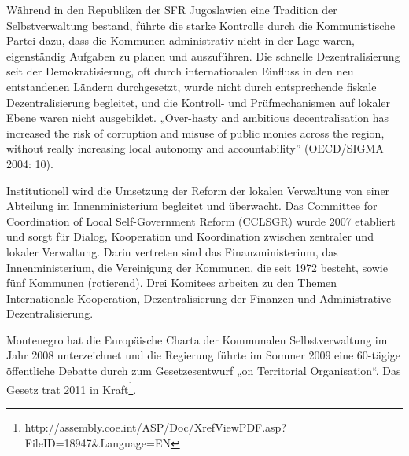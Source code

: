Während in den Republiken der SFR Jugoslawien eine Tradition der Selbstverwaltung bestand, führte die starke Kontrolle durch die Kommunistische Partei dazu, dass die Kommunen administrativ nicht in der Lage waren, eigenständig Aufgaben zu planen und auszuführen. Die schnelle Dezentralisierung seit der Demokratisierung, oft durch internationalen Einfluss in den neu entstandenen Ländern durchgesetzt, wurde nicht durch entsprechende fiskale Dezentralisierung begleitet, und die Kontroll- und Prüfmechanismen auf lokaler Ebene waren nicht ausgebildet. „Over-hasty and ambitious decentralisation has increased the risk of corruption and misuse of public monies across the region, without really increasing local autonomy and accountability” (OECD/SIGMA 2004: 10).\par
Institutionell wird die Umsetzung der Reform der lokalen Verwaltung von einer Abteilung im Innenministerium begleitet und überwacht. Das Committee for Coordination of Local Self-Government Reform (CCLSGR) wurde 2007 etabliert und sorgt für Dialog, Kooperation und Koordination zwischen zentraler und lokaler Verwaltung. Darin vertreten sind das Finanzministerium, das Innenministerium, die Vereinigung der Kommunen, die seit 1972 besteht, sowie fünf Kommunen (rotierend). Drei Komitees arbeiten zu den Themen Internationale Kooperation, Dezentralisierung der Finanzen und Administrative Dezentralisierung. \par
Montenegro hat die Europäische Charta der Kommunalen Selbstverwaltung im Jahr 2008 unterzeichnet und die Regierung führte im Sommer 2009 eine 60-tägige öffentliche Debatte durch zum Gesetzesentwurf „on Territorial Organisation“. Das Gesetz trat 2011 in Kraft\footnote{http://assembly.coe.int/ASP/Doc/XrefViewPDF.asp?FileID=18947\&Language=EN }. 


